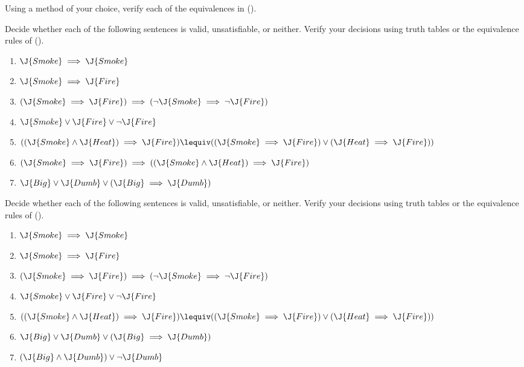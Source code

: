 \begin{exercise}%
Using a method of your choice, verify each of the equivalences
in  ().
\end{exercise} 

\begin{uexercise}%
Decide whether each of the following sentences is valid,
unsatisfiable, or neither.  Verify your decisions using truth tables
or the equivalence rules of  ().
\begin{enumerate}
\item \(\J{Smoke} \implies \J{Smoke}\)
\item \(\J{Smoke} \implies \J{Fire}\)
\item \((\J{Smoke} \implies \J{Fire}) \implies (\lnot \J{Smoke} \implies \lnot \J{Fire})\)
\item \(\J{Smoke} \lor \J{Fire} \lor \lnot \J{Fire}\)
\item \(((\J{Smoke} \land \J{Heat}) \implies \J{Fire}) 
        \lequiv ((\J{Smoke} \implies \J{Fire}) \lor (\J{Heat} \implies \J{Fire}))\)
\item \((\J{Smoke} \implies \J{Fire}) \implies 
        ((\J{Smoke} \land \J{Heat}) \implies \J{Fire}) \)
\item \(\J{Big} \lor \J{Dumb} \lor (\J{Big} \implies \J{Dumb})\)
\end{enumerate}
\end{uexercise} 

\begin{iexercise}%
Decide whether each of the following sentences is valid,
unsatisfiable, or neither.  Verify your decisions using truth tables
or the equivalence rules of  ().
\begin{enumerate}
\item \(\J{Smoke} \implies \J{Smoke}\)
\item \(\J{Smoke} \implies \J{Fire}\)
\item \((\J{Smoke} \implies \J{Fire}) \implies (\lnot \J{Smoke} \implies \lnot \J{Fire})\)
\item \(\J{Smoke} \lor \J{Fire} \lor \lnot \J{Fire}\)
\item \(((\J{Smoke} \land \J{Heat}) \implies \J{Fire}) 
        \lequiv ((\J{Smoke} \implies \J{Fire}) \lor (\J{Heat} \implies \J{Fire}))\)
\item \(\J{Big} \lor \J{Dumb} \lor (\J{Big} \implies \J{Dumb})\)
\item \((\J{Big} \land \J{Dumb}) \lor \lnot \J{Dumb}\)
\end{enumerate}
\end{iexercise} 

